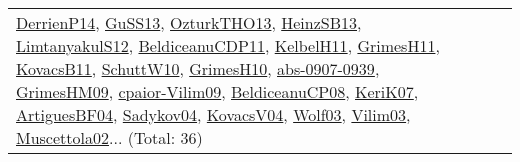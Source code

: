 {\begin{longtable}{lp{3cm}>{\raggedright}p{6cm}>{\raggedright}p{6cm}p{8cm}}
\href{papers/DerrienP14.pdf}{DerrienP14}\cite{DerrienP14}, \href{papers/GuSS13.pdf}{GuSS13}\cite{GuSS13}, \href{articles/OzturkTHO13.pdf}{OzturkTHO13}\cite{OzturkTHO13}, \href{articles/HeinzSB13.pdf}{HeinzSB13}\cite{HeinzSB13}, \href{articles/LimtanyakulS12.pdf}{LimtanyakulS12}\cite{LimtanyakulS12}, \href{articles/BeldiceanuCDP11.pdf}{BeldiceanuCDP11}\cite{BeldiceanuCDP11}, \href{articles/KelbelH11.pdf}{KelbelH11}\cite{KelbelH11}, \href{papers/GrimesH11.pdf}{GrimesH11}\cite{GrimesH11}, \href{articles/KovacsB11.pdf}{KovacsB11}\cite{KovacsB11}, \href{papers/SchuttW10.pdf}{SchuttW10}\cite{SchuttW10}, \href{papers/GrimesH10.pdf}{GrimesH10}\cite{GrimesH10}, \href{articles/abs-0907-0939.pdf}{abs-0907-0939}\cite{abs-0907-0939}, \href{papers/GrimesHM09.pdf}{GrimesHM09}\cite{GrimesHM09}, \href{papers/cpaior-Vilim09.pdf}{cpaior-Vilim09}\cite{cpaior-Vilim09}, \href{papers/BeldiceanuCP08.pdf}{BeldiceanuCP08}\cite{BeldiceanuCP08}, \href{papers/KeriK07.pdf}{KeriK07}\cite{KeriK07}, \href{papers/ArtiguesBF04.pdf}{ArtiguesBF04}\cite{ArtiguesBF04}, \href{papers/Sadykov04.pdf}{Sadykov04}\cite{Sadykov04}, \href{papers/KovacsV04.pdf}{KovacsV04}\cite{KovacsV04}, \href{papers/Wolf03.pdf}{Wolf03}\cite{Wolf03}, \href{papers/Vilim03.pdf}{Vilim03}\cite{Vilim03}, \href{papers/Muscettola02.pdf}{Muscettola02}\cite{Muscettola02}... (Total: 36)\\

\end{longtable}}
